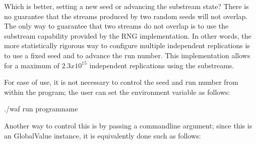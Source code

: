 \documentclass[letterpaper,10pt,english]{sphinxmanual}
\renewcommand{\sphinxcode}[1]{\texttt{\small{#1}}}
\begin{document}
\begin{sphinxVerbatim}[commandchars=\\\{\}]
   
    
    
    
\end{sphinxVerbatim}

Which is better, setting a new seed or advancing the substream state?  There is
no guarantee that the streams produced by two random seeds will not overlap.
The only way to guarantee that two streams do not overlap is to use the
substream capability provided by the RNG implementation.   In other words, the more statistically rigorous way to configure
multiple independent replications is to use a fixed seed and to advance the run
number.  This implementation allows for a maximum of \(2.3x10^{15}\)
independent replications using the substreams.

For ease of use, it is not necessary to control the seed and run number from
within the program; the user can set the \sphinxcode{} environment
variable as follows:

\begin{sphinxVerbatim}[commandchars=\\\{\}]
\PYGZdl{}  ./waf \PYGZhy{}\PYGZhy{}run program\PYGZhy{}name
\end{sphinxVerbatim}

Another way to control this is by passing a command\sphinxhyphen{}line argument; since this is
an  GlobalValue instance, it is equivalently done such as follows:
\end{document}
